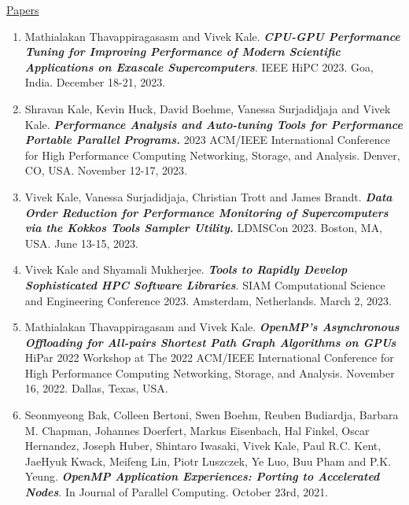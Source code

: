 




\underline{Papers}
\vspace*{-0.05in}
\begin{enumerate} 
\item Mathialakan Thavappiragasasm and Vivek Kale. \textbf{\it CPU-GPU Performance Tuning for Improving Performance of Modern Scientific Applications on Exascale Supercomputers}. IEEE HiPC 2023. Goa, India. December 18-21, 2023. 
\item Shravan Kale, Kevin Huck, David Boehme, Vanessa Surjadidjaja and Vivek Kale. \textbf{\it Performance Analysis and Auto-tuning Tools for Performance Portable Parallel Programs.} 2023 ACM/IEEE International Conference for High Performance Computing Networking, Storage, and Analysis. Denver, CO, USA. November 12-17, 2023. 

\item Vivek Kale, Vanessa Surjadidjaja, Christian Trott and James Brandt. \textbf{\it Data Order Reduction for Performance Monitoring of Supercomputers via the Kokkos Tools Sampler Utility. } LDMSCon 2023. Boston, MA, USA. June 13-15, 2023. 

\item Vivek Kale and Shyamali Mukherjee. \textbf{\it Tools to Rapidly Develop Sophisticated HPC Software Libraries}. SIAM Computational Science and Engineering Conference 2023. Amsterdam, Netherlands. March 2, 2023. 

\item Mathialakan Thavappiragasam and Vivek Kale. \textbf{ \it OpenMP’s Asynchronous Offloading for All-pairs Shortest Path Graph Algorithms on GPUs}  HiPar 2022 Workshop at The 2022 ACM/IEEE International Conference for High Performance Computing Networking, Storage, and Analysis. November 16, 2022. Dallas, Texas, USA.

\item Seonmyeong Bak, Colleen Bertoni, Swen Boehm, Reuben Budiardja, Barbara M. Chapman, Johannes Doerfert, Markus Eisenbach, Hal Finkel, Oscar Hernandez, Joseph Huber, Shintaro Iwasaki, Vivek Kale, Paul R.C. Kent, JaeHyuk Kwack, Meifeng Lin, Piotr Luszczek, Ye Luo, Buu Pham and P.K. Yeung. \textbf{\textit{OpenMP Application Experiences: Porting to Accelerated Nodes}}. In Journal of Parallel Computing. October 23rd, 2021.


\end{enumerate}

